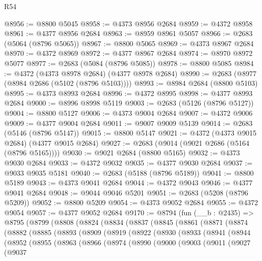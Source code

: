 \begin{lexlean}{R54}
\begin{coremodule}
@8956 := @8800 @5045
@8958 := @4373 @8956 @2684
@8959 := @4372 @8958
@8961 := @4377 @8956 @2684
@8963 := @8959 @8961 @5057
@8966 := @2683 (@5064 (@8796 @5065))
@8967 := @8800 @5065
@8969 := @4373 @8967 @2684
@8970 := @4372 @8969
@8972 := @4377 @8967 @2684
@8974 := @8970 @8972 @5077
@8977 := @2683 (@5084 (@8796 @5085))
@8978 := @8800 @5085
@8984 := @4372 (@4373 @8978 @2684) (@4377 @8978 @2684)
@8990 := @2683 (@8977 (@8984 @2686 (@5102 (@8796 @5103))))
@8993 := @8984 @2684 (@8800 @5103)
@8995 := @4373 @8993 @2684
@8996 := @4372 @8995
@8998 := @4377 @8993 @2684
@9000 := @8996 @8998 @5119
@9003 := @2683 (@5126 (@8796 @5127))
@9004 := @8800 @5127
@9006 := @4373 @9004 @2684
@9007 := @4372 @9006
@9009 := @4377 @9004 @2684
@9011 := @9007 @9009 @5139
@9014 := @2683 (@5146 (@8796 @5147))
@9015 := @8800 @5147
@9021 := @4372 (@4373 @9015 @2684) (@4377 @9015 @2684)
@9027 := @2683 (@9014 (@9021 @2686 (@5164 (@8796 @5165))))
@9030 := @9021 @2684 (@8800 @5165)
@9032 := @4373 @9030 @2684
@9033 := @4372 @9032
@9035 := @4377 @9030 @2684
@9037 := @9033 @9035 @5181
@9040 := @2683 (@5188 (@8796 @5189))
@9041 := @8800 @5189
@9043 := @4373 @9041 @2684
@9044 := @4372 @9043
@9046 := @4377 @9041 @2684
@9048 := @9044 @9046 @5201
@9051 := @2683 (@5208 (@8796 @5209))
@9052 := @8800 @5209
@9054 := @4373 @9052 @2684
@9055 := @4372 @9054
@9057 := @4377 @9052 @2684
@9170 := @8794
    (fun (__b : @2435) =>
    @8795
      (@8799
        (@8808
          (@8824
            (@8834
              (@8837
                (@8845
                  (@8861
                    (@8871
                      (@8874
                        (@8882
                          (@8885
                            (@8893
                              (@8909
                                (@8919
                                  (@8922
                                    (@8930
                                      (@8933
                                        (@8941
                                          (@8944
                                            (@8952
                                              (@8955
                                                (@8963
                                                  (@8966
                                                    (@8974
                                                      (@8990
                                                        (@9000
                                                          (@9003
                                                            (@9011
                                                              (@9027
                                                                (@9037

\end{coremodule}
\end{lexlean}
